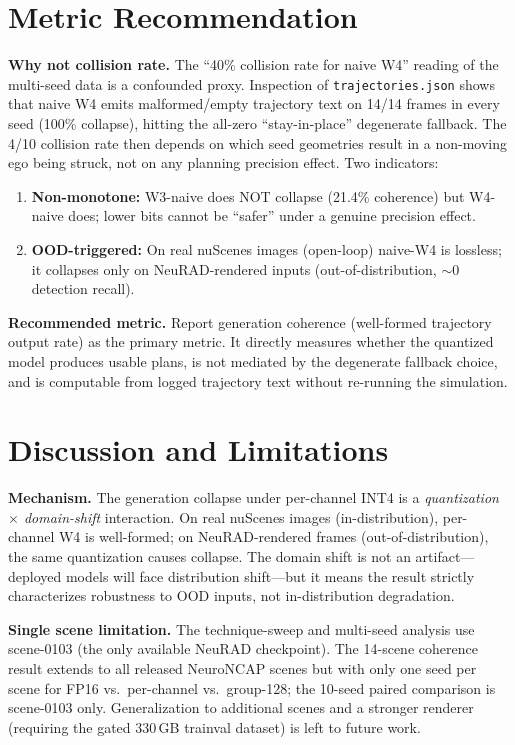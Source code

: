 \documentclass[conference]{IEEEtran}
\begin{document}
\section{Metric Recommendation}
\label{sec:metric}

\textbf{Why not collision rate.}
The ``40\% collision rate for naive W4'' reading of the multi-seed data is a confounded proxy.
Inspection of \texttt{trajectories.json} shows that naive W4 emits malformed/empty trajectory
text on 14/14 frames in every seed (100\% collapse), hitting the all-zero ``stay-in-place''
degenerate fallback. The 4/10 collision rate then depends on which seed geometries result in a
non-moving ego being struck, not on any planning precision effect. Two indicators:
\begin{enumerate}
  \item \textbf{Non-monotone:} W3-naive does NOT collapse (21.4\% coherence) but W4-naive does;
        lower bits cannot be ``safer'' under a genuine precision effect.
  \item \textbf{OOD-triggered:} On real nuScenes images (open-loop) naive-W4 is lossless; it
        collapses only on NeuRAD-rendered inputs (out-of-distribution, $\sim$0 detection recall).
\end{enumerate}

\textbf{Recommended metric.}
Report generation coherence (well-formed trajectory output rate) as the primary metric. It
directly measures whether the quantized model produces usable plans, is not mediated by the
degenerate fallback choice, and is computable from logged trajectory text without re-running
the simulation.

\section{Discussion and Limitations}
\label{sec:discussion}

\textbf{Mechanism.}
The generation collapse under per-channel INT4 is a \emph{quantization $\times$ domain-shift}
interaction. On real nuScenes images (in-distribution), per-channel W4 is well-formed; on
NeuRAD-rendered frames (out-of-distribution), the same quantization causes collapse. The
domain shift is not an artifact---deployed models will face distribution shift---but it means
the result strictly characterizes robustness to OOD inputs, not in-distribution degradation.

\textbf{Single scene limitation.}
The technique-sweep and multi-seed analysis use scene-0103 (the only available NeuRAD checkpoint).
The 14-scene coherence result extends to all released NeuroNCAP scenes but with only one seed
per scene for FP16 vs.\ per-channel vs.\ group-128; the 10-seed paired comparison is scene-0103
only. Generalization to additional scenes and a stronger renderer (requiring the gated 330\,GB
trainval dataset) is left to future work.
\end{document}
